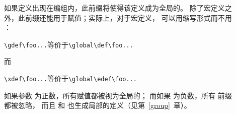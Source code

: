 \documentclass[letterpaper]{book}
\begin{document}
\begin{description}
\item []
如果定义出现在编组内，此前缀将使得该定义成为全局的。
除了宏定义之外，此前缀还能用于赋值；实际上，对于宏定义，
可以用缩写形式而不用 ：
\begin{disp}\verb>\gdef\foo...>\quad 等价于\quad \verb>\global\def\foo...>
\end{disp} 而
\begin{disp}\verb>\xdef\foo...>\quad 等价于\quad \verb>\global\edef\foo...>
\end{disp}

如果参数  为正数，所有赋值都被视为全局的；
而如果  为负数，所有  前缀都被忽略，
而且  和  也生成局部的定义（见第~\ref{group}~章）。


\end{description}
\end{document}

